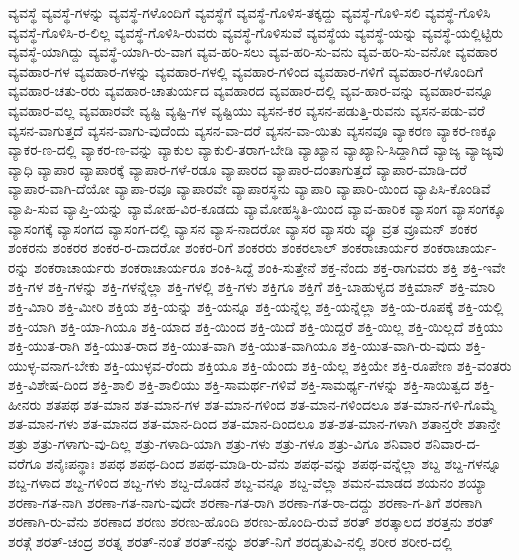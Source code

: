 {ವ್ಯವಸ್ಥೆ
ವ್ಯವಸ್ಥೆ-ಗಳನ್ನು
ವ್ಯವಸ್ಥೆ-ಗಳೊಂದಿಗೆ
ವ್ಯವಸ್ಥೆಗೆ
ವ್ಯವಸ್ಥೆ-ಗೊಳಿಸ-ತಕ್ಕದ್ದು
ವ್ಯವಸ್ಥೆ-ಗೊಳಿ-ಸಲಿ
ವ್ಯವಸ್ಥೆ-ಗೊಳಿಸಿ
ವ್ಯವಸ್ಥೆ-ಗೊಳಿಸಿ-ರ-ಲಿಲ್ಲ
ವ್ಯವಸ್ಥೆ-ಗೊಳಿಸಿ-ರುವರು
ವ್ಯವಸ್ಥೆ-ಗೊಳಿಸುವೆ
ವ್ಯವಸ್ಥೆಯ
ವ್ಯವಸ್ಥೆ-ಯನ್ನು
ವ್ಯವಸ್ಥೆ-ಯಲ್ಲಿಟ್ಟಿರು
ವ್ಯವಸ್ಥೆ-ಯಾಗಿದ್ದು
ವ್ಯವಸ್ಥೆ-ಯಾಗಿ-ರು-ವಾಗ
ವ್ಯವ-ಹರಿ-ಸಲು
ವ್ಯವ-ಹರಿ-ಸು-ವನು
ವ್ಯವ-ಹರಿ-ಸು-ವನೋ
ವ್ಯವಹಾರ
ವ್ಯವಹಾರ-ಗಳ
ವ್ಯವಹಾರ-ಗಳನ್ನು
ವ್ಯವಹಾರ-ಗಳಲ್ಲಿ
ವ್ಯವಹಾರ-ಗಳಿಂದ
ವ್ಯವಹಾರ-ಗಳಿಗೆ
ವ್ಯವಹಾರ-ಗಳೊಂದಿಗೆ
ವ್ಯವಹಾರ-ಚತು-ರರು
ವ್ಯವಹಾರ-ಚಾತುರ್ಯದ
ವ್ಯವಹಾರದ
ವ್ಯವಹಾರ-ದಲ್ಲಿ
ವ್ಯವ-ಹಾರ-ವನ್ನು
ವ್ಯವಹಾರ-ವನ್ನೂ
ವ್ಯವಹಾರ-ವಲ್ಲ
ವ್ಯವಹಾರವೇ
ವ್ಯಷ್ಟಿ
ವ್ಯಷ್ಟಿ-ಗಳ
ವ್ಯಷ್ಟಿಯು
ವ್ಯಸನ-ಕರ
ವ್ಯಸನ-ಪಡುತ್ತಿ-ರುವನು
ವ್ಯಸನ-ಪಡು-ವರೆ
ವ್ಯಸನ-ವಾಗುತ್ತದೆ
ವ್ಯಸನ-ವಾಗು-ವುದೆಂದು
ವ್ಯಸನ-ವಾ-ದರೆ
ವ್ಯಸನ-ವಾ-ಯಿತು
ವ್ಯಸನವೂ
ವ್ಯಾಕರಣ
ವ್ಯಾಕರ-ಣಕ್ಕೂ
ವ್ಯಾಕರ-ಣ-ದಲ್ಲಿ
ವ್ಯಾಕರ-ಣ-ವನ್ನು
ವ್ಯಾಕುಲ
ವ್ಯಾಕುಲಿ-ತರಾಗ-ಬೇಡಿ
ವ್ಯಾಖ್ಯಾನ
ವ್ಯಾಖ್ಯಾನಿ-ಸಿದ್ದಾಗಿದೆ
ವ್ಯಾಜ್ಯ
ವ್ಯಾಜ್ಯವು
ವ್ಯಾಧಿ
ವ್ಯಾಪಾರ
ವ್ಯಾಪಾರಕ್ಕೆ
ವ್ಯಾಪಾರ-ಗಳೆ-ರಡೂ
ವ್ಯಾಪಾರದ
ವ್ಯಾಪಾರ-ದಂತಾಗುತ್ತದೆ
ವ್ಯಾಪಾರ-ಮಾಡಿ-ದರೆ
ವ್ಯಾಪಾರ-ವಾಗಿ-ದೆಯೋ
ವ್ಯಾಪಾ-ರವೂ
ವ್ಯಾಪಾರವೇ
ವ್ಯಾಪಾರಸ್ಥನು
ವ್ಯಾಪಾರಿ
ವ್ಯಾಪಾರಿ-ಯಿಂದ
ವ್ಯಾಪಿಸಿ-ಕೊಂಡಿವೆ
ವ್ಯಾಪಿ-ಸುವ
ವ್ಯಾಪ್ತಿ-ಯನ್ನು
ವ್ಯಾಮೋಹ-ವಿರ-ಕೂಡದು
ವ್ಯಾಮೋಹಸ್ಥಿತಿ-ಯಿಂದ
ವ್ಯಾವ-ಹಾರಿಕ
ವ್ಯಾಸಂಗ
ವ್ಯಾಸಂಗಕ್ಕೂ
ವ್ಯಾಸಂಗಕ್ಕೆ
ವ್ಯಾಸಂಗದ
ವ್ಯಾಸಂಗ-ದಲ್ಲಿ
ವ್ಯಾಸನ
ವ್ಯಾಸ-ನಾದರೋ
ವ್ಯಾಸರ
ವ್ಯಾಸರು
ವ್ಯೂ
ವ್ರತ
ವ್ರೂಮನ್
ಶಂಕರ
ಶಂಕರನು
ಶಂಕರರ
ಶಂಕರ-ರ-ದಾದರೋ
ಶಂಕರ-ರಿಗೆ
ಶಂಕರರು
ಶಂಕರಲಾಲ್
ಶಂಕರಾಚಾರ್ಯರ
ಶಂಕರಾಚಾರ್ಯ-ರನ್ನು
ಶಂಕರಾಚಾರ್ಯರು
ಶಂಕರಾಚಾರ್ಯರೂ
ಶಂಕಿ-ಸಿದ್ದೆ
ಶಂಕಿ-ಸುತ್ತೇನೆ
ಶಕ್ತ-ನೆಂದು
ಶಕ್ತ-ರಾಗುವರು
ಶಕ್ತಿ
ಶಕ್ತಿ-ಇವೇ
ಶಕ್ತಿ-ಗಳ
ಶಕ್ತಿ-ಗಳನ್ನು
ಶಕ್ತಿ-ಗಳನ್ನೆಲ್ಲಾ
ಶಕ್ತಿ-ಗಳಲ್ಲಿ
ಶಕ್ತಿ-ಗಳು
ಶಕ್ತಿಗೂ
ಶಕ್ತಿಗೆ
ಶಕ್ತಿ-ಬಾಹುಳ್ಯದ
ಶಕ್ತಿಮಾನ್
ಶಕ್ತಿ-ಮಾರಿ
ಶಕ್ತಿ-ಮಿಾರಿ
ಶಕ್ತಿ-ಮೀರಿ
ಶಕ್ತಿಯ
ಶಕ್ತಿ-ಯನ್ನು
ಶಕ್ತಿ-ಯನ್ನೂ
ಶಕ್ತಿ-ಯನ್ನೆಲ್ಲ
ಶಕ್ತಿ-ಯನ್ನೆಲ್ಲಾ
ಶಕ್ತಿ-ಯ-ರೂಪಕ್ಕೆ
ಶಕ್ತಿ-ಯಲ್ಲಿ
ಶಕ್ತಿ-ಯಾಗಿ
ಶಕ್ತಿ-ಯಾ-ಗಿಯೂ
ಶಕ್ತಿ-ಯಾದ
ಶಕ್ತಿ-ಯಿಂದ
ಶಕ್ತಿ-ಯಿದೆ
ಶಕ್ತಿ-ಯಿದ್ದರೆ
ಶಕ್ತಿ-ಯಿಲ್ಲ
ಶಕ್ತಿ-ಯಿಲ್ಲದೆ
ಶಕ್ತಿಯು
ಶಕ್ತಿ-ಯುತ-ರಾಗಿ
ಶಕ್ತಿ-ಯುತ-ರಾದ
ಶಕ್ತಿ-ಯುತ-ವಾಗಿ
ಶಕ್ತಿ-ಯುತ-ವಾಗಿಯೂ
ಶಕ್ತಿ-ಯುತ-ವಾಗಿ-ರು-ವುದು
ಶಕ್ತಿ-ಯುಳ್ಳ-ವನಾಗ-ಬೇಕು
ಶಕ್ತಿ-ಯುಳ್ಳವ-ರೆಂದು
ಶಕ್ತಿಯೂ
ಶಕ್ತಿ-ಯೆಂದು
ಶಕ್ತಿ-ಯೆಲ್ಲ
ಶಕ್ತಿಯೇ
ಶಕ್ತಿ-ರೂಪೇಣ
ಶಕ್ತಿ-ವಂತರು
ಶಕ್ತಿ-ವಿಶೇಷ-ದಿಂದ
ಶಕ್ತಿ-ಶಾಲಿ
ಶಕ್ತಿ-ಶಾಲಿಯು
ಶಕ್ತಿ-ಸಾಮರ್ಥ-ಗಳಿವೆ
ಶಕ್ತಿ-ಸಾಮರ್ಥ್ಯ-ಗಳನ್ನು
ಶಕ್ತಿ-ಸಾಯಿತ್ವದ
ಶಕ್ತಿ-ಹೀನರು
ಶತಪಥ
ಶತ-ಮಾನ
ಶತ-ಮಾನ-ಗಳ
ಶತ-ಮಾನ-ಗಳಿಂದ
ಶತ-ಮಾನ-ಗಳಿಂದಲೂ
ಶತ-ಮಾನ-ಗಳಿ-ಗೊಮ್ಮೆ
ಶತ-ಮಾನ-ಗಳು
ಶತ-ಮಾನದ
ಶತ-ಮಾನ-ದಿಂದ
ಶತ-ಮಾನ-ದಿಂದಲೂ
ಶತ-ಶತ-ಮಾನ-ಗಳಾಗಿ
ಶತಾನ್ತರೇ
ಶತಾನ್ತೇ
ಶತ್ರು
ಶತ್ರು-ಗಳಾಗು-ವು-ದಿಲ್ಲ
ಶತ್ರು-ಗಳಾದಿ-ಯಾಗಿ
ಶತ್ರು-ಗಳು
ಶತ್ರು-ಗಳೂ
ಶತ್ರು-ವಿಗೂ
ಶನಿವಾರ
ಶನಿವಾರ-ದ-ವರೆಗೂ
ಶನೈಃಪನ್ಥಾಃ
ಶಪಥ
ಶಪಥ-ದಿಂದ
ಶಪಥ-ಮಾಡಿ-ರು-ವೆನು
ಶಪಥ-ವನ್ನು
ಶಪಥ-ವನ್ನೆಲ್ಲಾ
ಶಬ್ದ
ಶಬ್ದ-ಗಳನ್ನೂ
ಶಬ್ದ-ಗಳಾದ
ಶಬ್ದ-ಗಳಿಂದ
ಶಬ್ದ-ಗಳು
ಶಬ್ದ-ದೊಡನೆ
ಶಬ್ದ-ವನ್ನೂ
ಶಬ್ದ-ವೆಲ್ಲಾ
ಶಮನ-ಮಾಡದ
ಶಯನಂ
ಶಯ್ಯಾ
ಶರಣಾ-ಗತ-ನಾಗಿ
ಶರಣಾ-ಗತ-ನಾಗು-ವುದೇ
ಶರಣಾ-ಗತ-ರಾಗಿ
ಶರಣಾ-ಗತ-ರಾ-ದದ್ದು
ಶರಣಾ-ಗ-ತಿಗೆ
ಶರಣಾಗಿ
ಶರಣಾಗಿ-ರು-ವೆನು
ಶರಣಾದ
ಶರಣು
ಶರಣು-ಹೊಂದಿ
ಶರಣು-ಹೊಂದಿ-ರುವೆ
ಶರತ್
ಶರತ್ಕಾಲದ
ಶರತ್ತನು
ಶರತ್
ಶರತ್ಗೆ
ಶರತ್-ಚಂದ್ರ
ಶರತ್ನ
ಶರತ್-ನಂತೆ
ಶರತ್-ನನ್ನು
ಶರತ್-ನಿಗೆ
ಶರದೃತುವಿ-ನಲ್ಲಿ
ಶರೀರ
ಶರೀರ-ದಲ್ಲಿ
}
